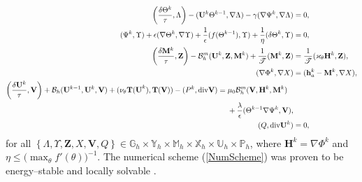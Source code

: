 \documentclass[11pt,fullpage]{article}
\newcommand{\eps}{\epsilon}
\newcommand{\set}[1]{\left\{#1\right\}}
\newcommand{\grad}{\nabla}
\newcommand{\diver}{\textup{div} }
\theoremstyle{lemma}
\theoremstyle{definition}
\theoremstyle{lemma}
\begin{document}
\begin{subequations}\label{NumScheme}
	\begin{align}
	\label{NumScheme:1}\bigg(\frac{\delta\Theta^k}{\tau}, \Lambda\bigg) - (\mathbf{U}^k\Theta^{k-1}, \grad\Lambda) - \gamma(\grad \Psi^k, \grad \Lambda)&=0,\\
	\label{NumScheme:2}(\Psi^k, \Upsilon) + \eps(\grad \Theta^k, \grad \Upsilon) + \frac{1}{\eps}(f(\Theta^{k-1}), \Upsilon) + \frac{1}{\eta}(\delta\Theta^k, \Upsilon) &= 0,\\
	\label{NumScheme:3}\bigg(\frac{\delta\mathbf{M}^k}{\tau}, \mathbf{Z}\bigg) - \mathcal{B}_h^m(\mathbf{U}^k, \mathbf{Z}, \mathbf{M}^k) + \frac{1}{\mathscr{T}}(\mathbf{M}^k, \mathbf{Z}) &= \frac{1}{\mathscr{T}}(\varkappa_\theta\mathbf{H}^k, \mathbf{Z}),\\
	\label{NumScheme:4}(\grad\Phi^k, \grad X) &= (\mathbf{h}_a^k - \mathbf{M}^k, \grad X),\\
	\begin{split}
	\label{NumScheme:5}\bigg(\frac{\delta\mathbf{U}^k}{\tau}, \mathbf{V}\bigg) + \mathcal{B}_h(\mathbf{U}^{k-1}, \mathbf{U}^k, \mathbf{V}) + (\nu_\theta\mathbf{T(U}^k), \mathbf{T(V)}) - (P^k, \diver \mathbf{V}) &= \mu_0\mathcal{B}_h^m(\mathbf{V}, \mathbf{H}^k, \mathbf{M}^k)\\
	&\phantom{{}={}}+\frac{\lambda}{\eps}(\Theta^{k-1}\grad \Psi^k, \mathbf{V}),
	\end{split}\\
	\label{NumScheme:6}(Q, \diver\mathbf{U}^k) &= 0,
	\end{align}
\end{subequations}
for all $\set{\Lambda, \Upsilon, \mathbf{Z}, X, \mathbf{V}, Q}\in \mathbb{G}_h\times \mathbb{Y}_h\times \mathbb{M}_h\times\mathbb{X}_h\times\mathbb{U}_h\times\mathbb{P}_h$, where $\mathbf{H}^k=\grad \Phi^k$ and $\eta \leq \big(\max_\theta f'(\theta)\big)^{-1}$. The numerical scheme (\ref{NumScheme}) was proven to be energy--stable and locally solvable \cite{DiffuseInterface}. 
\end{document}
